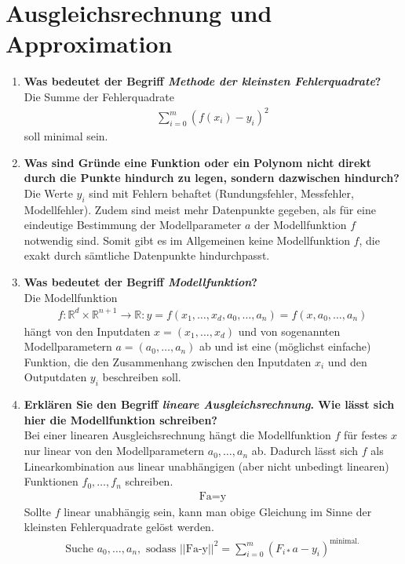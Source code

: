 \section{Ausgleichsrechnung und Approximation}
	\begin{enumerate}
		\item \textbf{Was bedeutet der Begriff \textit{Methode der kleinsten Fehlerquadrate}?} \\
			Die Summe der Fehlerquadrate
			\begin{align*}
				\sum_{i=0}^{m}(f(x_i)-y_i)^2
			\end{align*}
			soll minimal sein.
		\item \textbf{Was sind Gründe eine Funktion oder ein Polynom nicht direkt durch die Punkte hindurch zu legen, sondern dazwischen hindurch?} \\
			Die Werte \(y_i\) sind mit Fehlern behaftet (Rundungsfehler, Messfehler, Modellfehler). Zudem sind meist mehr Datenpunkte gegeben, als für eine eindeutige Bestimmung der Modellparameter \(a\)  der Modellfunktion \(f\) notwendig sind. Somit gibt es im Allgemeinen keine Modellfunktion \(f\), die exakt durch sämtliche Datenpunkte hindurchpasst.
		
		\item \textbf{Was bedeutet der Begriff \textit{Modellfunktion}?} \\
			Die Modellfunktion
			\begin{align*}
				f:\mathbb{R}^d\times\mathbb{R}^{n+1}\rightarrow\mathbb{R}:y=f(x_1,\dots,x_d,a_0,\dots,a_n)=f(x,a_0,\dots,a_n)
			\end{align*}
			hängt von den Inputdaten \(x=(x_1,\dots,x_d)\) und von sogenannten Modellparametern \(a=(a_0,\dots,a_n)\) ab und ist eine (möglichst einfache) Funktion, die den Zusammenhang zwischen den Inputdaten \(x_i\) und den Outputdaten \(y_i\) beschreiben soll.
		
		\item \textbf{Erklären Sie den Begriff \textit{lineare Ausgleichsrechnung}. Wie lässt sich hier die Modellfunktion schreiben?} \\
			Bei einer linearen Ausgleichsrechnung hängt die Modellfunktion \(f\) für festes \(x\) nur linear von den Modellparametern \(a_0,\dots,a_n\) ab. Dadurch lässt sich \(f\) als Linearkombination aus linear unabhängigen (aber nicht unbedingt linearen) Funktionen \(f_0,\dots,f_n\) schreiben.
			\begin{align*}
				\text{Fa}=\text{y}
			\end{align*}
			Sollte \(f\) linear unabhängig sein, kann man obige Gleichung im Sinne der kleinsten Fehlerquadrate gelöst werden.
			\begin{align*}
				\text{Suche } a_0,\dots,a_n,\text{ sodass } ||\text{Fa-y}||^2=\sum_{i=0}^{m}\left(F_{i*}a-y_i\right)^ \text{minimal.}
			\end{align*}
		

\end{enumerate}
